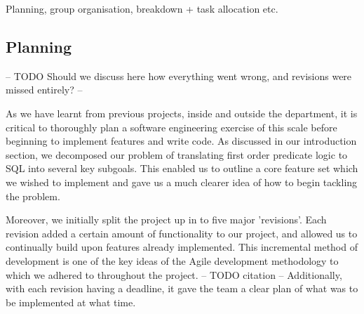 \documentclass[a4wide, 11pt]{article}
\begin{document}
        Planning, group organisation, breakdown + task allocation etc.

\subsection{Planning}

-- TODO Should we discuss here how everything went wrong, and revisions were
missed entirely? --

As we have learnt from previous projects, inside and outside the department, it
is critical to thoroughly plan a software engineering exercise of this scale
before beginning to implement features and write code. As discussed in our
introduction section, we decomposed our problem of translating first order
predicate logic to SQL into several key subgoals. This enabled us to outline a
core feature set which we wished to implement and gave us a much clearer idea
of how to begin tackling the problem.

Moreover, we initially split the project up in to five major 'revisions'. Each
revision added a certain amount of functionality to our project, and allowed us
to continually build upon features already implemented. This incremental method
of development is one of the key ideas of the Agile development methodology to
which we adhered to throughout the project. -- TODO citation -- Additionally,
with each revision having a deadline, it gave the team a clear plan of what was
to be implemented at what time.
\end{document}
